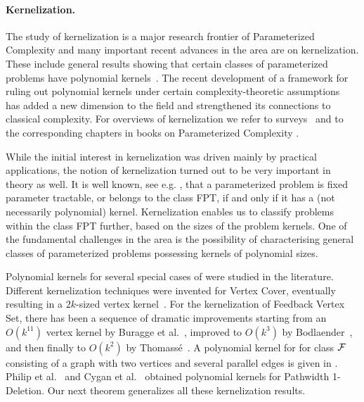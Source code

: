   






\vspace{-.3cm}
\paragraph{Kernelization.}
The study of kernelization is a major research frontier of 
Parameterized Complexity and many important recent advances in the area
are on kernelization. These include 
general results
showing that  certain classes of parameterized problems have polynomial kernels~\cite{Alon:2010vp,H.Bodlaender:2009ng,FominLST10,KratschW12}. 
The recent development of a framework for ruling out polynomial kernels under
certain complexity-theoretic
assumptions~\cite{BDFH08,Dell:2010sh,FS08}    has added a new dimension to
the field and strengthened its connections to classical complexity.  For overviews of kernelization we  refer to surveys~\cite{Bodlaender09,GN07SIGACT}  and to the corresponding chapters in books on Parameterized Complexity 
\cite{FlumGroheBook,Niedermeierbook06}.

While the initial interest in kernelization was driven mainly by practical applications, the notion of kernelization turned out to be very important in theory as well. It is well known, see e.g. \cite{DowneyF99}, that a parameterized problem is fixed parameter tractable, or belongs to the class FPT,  if and only if it has a (not necessarily polynomial) kernel. Kernelization enables us to classify problems within the class FPT further, based on the sizes of the problem kernels. 
One of the fundamental challenges in the area is the possibility of characterising general classes of parameterized problems possessing kernels of polynomial sizes.  

Polynomial kernels for several special cases of \fd{} were studied in the literature.  
 Different kernelization techniques were invented for {\sc Vertex Cover}, eventually resulting in a
 $2k$-sized vertex kernel~\cite{AFLS07,ChenKJ01,DFRS04,Hochbaum:1994kl}.
 For the kernelization of {\sc  Feedback Vertex Set}, there has been a sequence of
 dramatic improvements starting from an $O(k^{11})$ vertex kernel by
 Buragge et al.~\cite{BEFLMR2006}, improved to  $O(k^3)$ by
 Bodlaender~\cite{Bod07}, and then finally to $O(k^2)$ by
 Thomass\'e~\cite{T09}.  A polynomial kernel for \fd{}  for class  ${\cal F}$ consisting of a graph with two vertices and several parallel edges is given in \cite{FominLMPS11}.
 Philip et al.~\cite{PhilipRS09} and Cygan et al.~\cite{CyganPPW10} obtained polynomial kernels for {\sc  Pathwidth 1-Deletion}. Our next theorem generalizes all these kernelization results.   

